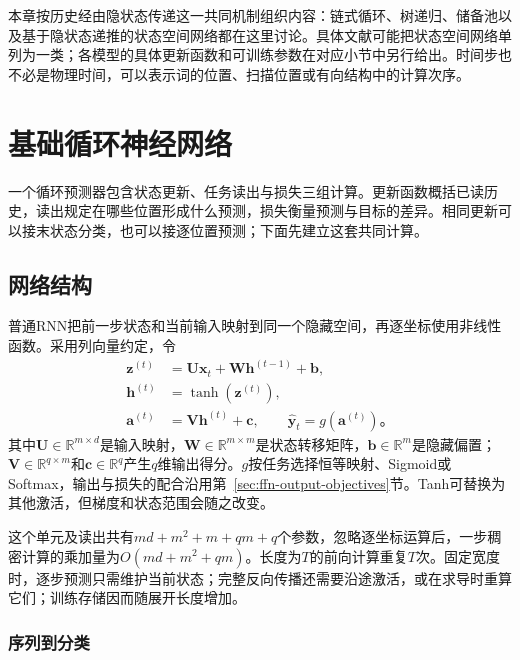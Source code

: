 本章按历史经由隐状态传递这一共同机制组织内容：链式循环、树递归、储备池以及基于隐状态递推的状态空间网络都在这里讨论。具体文献可能把状态空间网络单列为一类；各模型的具体更新函数和可训练参数在对应小节中另行给出。时间步也不必是物理时间，可以表示词的位置、扫描位置或有向结构中的计算次序。

\section{基础循环神经网络}
\label{sec:rnn-basic}

一个循环预测器包含状态更新、任务读出与损失三组计算。更新函数概括已读历史，读出规定在哪些位置形成什么预测，损失衡量预测与目标的差异。相同更新可以接末状态分类，也可以接逐位置预测；下面先建立这套共同计算。

\subsection{网络结构}
\label{sec:rnn-structure}

普通RNN把前一步状态和当前输入映射到同一个隐藏空间，再逐坐标使用非线性函数。采用列向量约定，令
\begin{equation}
  \begin{aligned}
    \bm{z}^{(t)}&=\bm{U}\bm{x}_t+\bm{W}\bm{h}^{(t-1)}+\bm{b},\\
    \bm{h}^{(t)}&=\tanh\!\left(\bm{z}^{(t)}\right),\\
    \bm{a}^{(t)}&=\bm{V}\bm{h}^{(t)}+\bm{c},\qquad
    \widehat{\bm{y}}_t=g\!\left(\bm{a}^{(t)}\right)\text{。}
  \end{aligned}
  \label{eq:rnn-basic-cell}
\end{equation}
其中$\bm{U}\in\mathbb{R}^{m\times d}$是输入映射，$\bm{W}\in\mathbb{R}^{m\times m}$是状态转移矩阵，$\bm{b}\in\mathbb{R}^{m}$是隐藏偏置；$\bm{V}\in\mathbb{R}^{q\times m}$和$\bm{c}\in\mathbb{R}^{q}$产生$q$维输出得分。$g$按任务选择恒等映射、Sigmoid或Softmax，输出与损失的配合沿用第~\ref{sec:ffn-output-objectives}节。Tanh可替换为其他激活，但梯度和状态范围会随之改变。

这个单元及读出共有$md+m^2+m+qm+q$个参数，忽略逐坐标运算后，一步稠密计算的乘加量为$O(md+m^2+qm)$。长度为$T$的前向计算重复$T$次。固定宽度时，逐步预测只需维护当前状态；完整反向传播还需要沿途激活，或在求导时重算它们；训练存储因而随展开长度增加。

\subsubsection{序列到分类}
\label{sec:rnn-sequence-classification}

